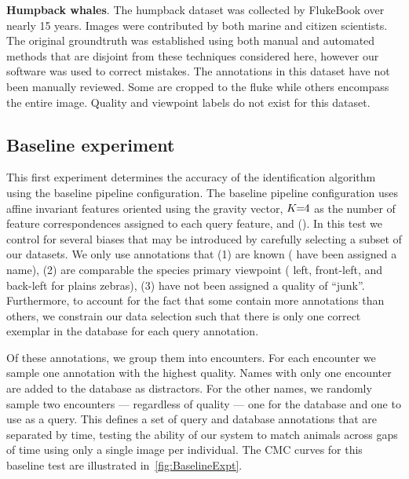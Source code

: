 \begin{itemln}
            \item \textbf{Humpback whales}. The humpback dataset was collected by FlukeBook over nearly 15 years.
            Images were contributed by both marine and citizen scientists. The original groundtruth was established
            using both manual and automated methods that are disjoint from these techniques considered here,
            however our software was used to correct mistakes. The annotations in this dataset have not been
            manually reviewed. Some are cropped to the fluke while others encompass the entire image. Quality and
            viewpoint labels do not exist for this dataset.
        \end{itemln}

    \FloatBarrier{}
    \subsection{Baseline experiment}\label{sub:exptbase}

        This first experiment determines the accuracy of the identification algorithm using the baseline pipeline
        configuration. The baseline pipeline configuration uses affine invariant features oriented using the
        gravity vector, $K\mkern-6mu=\mkern-6mu4$ as the number of feature correspondences assigned to each query feature, and
        \nscoring{} (\nsum{}). In this test we control for several biases that may be introduced by carefully
        selecting a subset of our datasets. We only use annotations that (1) are known (\ie{} have been assigned a
        name), (2) are comparable the species primary viewpoint (\eg{} left, front-left, and back-left for plains
        zebras), (3) have not been assigned a quality of ``junk''. Furthermore, to account for the fact that some
        \names{} contain more annotations than others, we constrain our data selection such that there is only one
        correct exemplar in the database for each query annotation.

        Of these annotations, we group them into encounters. For each encounter we sample one annotation with the
        highest quality. Names with only one encounter are added to the database as distractors. For the other
        names, we randomly sample two encounters --- regardless of quality --- one for the database and one to use
        as a query. This defines a set of query and database annotations that are separated by time, testing the
        ability of our system to match animals across gaps of time using only a single image per individual. The
        CMC curves for this baseline test are illustrated in~\cref{fig:BaselineExpt}.

